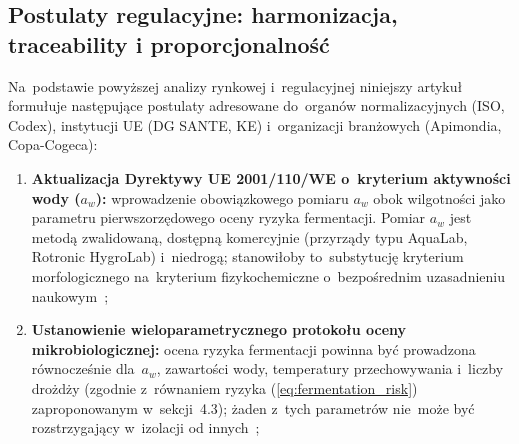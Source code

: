 \subsection{Postulaty regulacyjne: harmonizacja, traceability i proporcjonalność}

Na~podstawie powyższej analizy rynkowej i~regulacyjnej
niniejszy artykuł formułuje następujące postulaty
adresowane do~organów normalizacyjnych (ISO, Codex),
instytucji UE (DG SANTE, KE) i~organizacji branżowych
(Apimondia, Copa-Cogeca):

\begin{enumerate}
    \item \textbf{Aktualizacja Dyrektywy UE 2001/110/WE
          o~kryterium aktywności wody ($a_w$):}
          wprowadzenie obowiązkowego pomiaru $a_w$
          obok wilgotności jako parametru pierwszorzędowego
          oceny ryzyka fermentacji. Pomiar $a_w$ jest
          metodą zwalidowaną, dostępną komercyjnie
          (przyrządy typu AquaLab, Rotronic HygroLab)
          i~niedrogą; stanowiłoby to~substytucję
          kryterium morfologicznego na~kryterium
          fizykochemiczne o~bezpośrednim uzasadnieniu
          naukowym~\cite{ruegg1981,zamora2006};

    \item \textbf{Ustanowienie wieloparametrycznego protokołu
          oceny mikrobiologicznej:} ocena ryzyka
          fermentacji powinna być prowadzona
          równocześnie dla~$a_w$, zawartości wody,
          temperatury przechowywania i~liczby drożdży
          (zgodnie z~równaniem ryzyka (\ref{eq:fermentation_risk})
          zaproponowanym w~sekcji~4.3); żaden z~tych
          parametrów nie~może być rozstrzygający
          w~izolacji od innych~\cite{analytica2020,apinz2021};




\end{enumerate}

